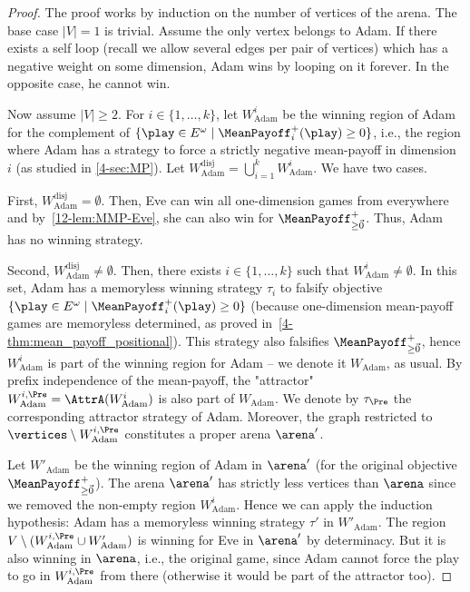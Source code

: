 \begin{proof}
The proof works by induction on the number of vertices of the arena. The base case $\vert V\vert = 1$ is trivial. Assume the only vertex belongs to Adam. If there exists a self loop (recall we allow several edges per pair of vertices) which has a negative weight on some dimension, Adam wins by looping on it forever. In the opposite case, he cannot win.

Now assume $\vert V\vert \geq 2$. For $i \in \{1,\ldots,k\}$, let $W^i_{\text{Adam}}$ be the winning region of Adam for the complement of $\{\play \in E^\omega \mid \MeanPayoff^{+}_{i}(\play) \geq 0\}$, i.e., the region where Adam has a strategy to force a strictly negative mean-payoff in dimension $i$ (as studied in \cref{4-sec:MP}). Let $W^{\text{disj}}_{\text{Adam}} = \bigcup_{i = 1}^{k} W^i_{\text{Adam}}$. We have two cases.

First, $W^{\text{disj}}_{\text{Adam}} = \emptyset$. Then, Eve can win all one-dimension games from everywhere and by~\cref{12-lem:MMP-Eve}, she can also win for $\MeanPayoff^{+}_{\geq \vec{0}}$. Thus, Adam has no winning strategy.

Second, $W^{\text{disj}}_{\text{Adam}} \neq \emptyset$. Then, there exists $i \in \{1,\ldots,k\}$ such that $W^i_{\text{Adam}} \neq \emptyset$. In this set, Adam has a memoryless winning strategy $\tau_i$ to falsify objective $\{\play \in E^\omega \mid \MeanPayoff^{+}_{i}(\play) \geq 0\}$ (because one-dimension mean-payoff games are memoryless determined, as proved in~\cref{4-thm:mean_payoff_positional}). This strategy also falsifies $\MeanPayoff^{+}_{\geq \vec{0}}$, hence $W^i_{\text{Adam}}$ is part of the winning region for Adam -- we denote it $W_{\text{Adam}}$, as usual.
By prefix independence of the mean-payoff, the "attractor" $W^{i, \Pre}_{\text{Adam}}= \AttrA(W^i_{\text{Adam}})$ is also part of $W_{\text{Adam}}$. We denote by $\tau_\Pre$ the corresponding attractor strategy of Adam. Moreover, the graph restricted to $\vertices \setminus W^{i, \Pre}_{\text{Adam}}$ constitutes a proper arena $\arena'$.

Let $W'_{\text{Adam}}$ be the winning region of Adam in $\arena'$ (for the original objective $\MeanPayoff^{+}_{\geq \vec{0}}$). The arena $\arena'$ has strictly less vertices than $\arena$ since we removed the non-empty region $W^i_{\text{Adam}}$. Hence we can apply the induction hypothesis: Adam has a memoryless winning strategy $\tau'$ in $W'_{\text{Adam}}$. The region $V \setminus (W^{i, \Pre}_{\text{Adam}} \cup W'_{\text{Adam}})$ is winning for Eve in $\arena'$ by determinacy. But it is also winning in $\arena$, i.e., the original game, since Adam cannot force the play to go in $W^{i, \Pre}_{\text{Adam}}$ from there (otherwise it would be part of the attractor too).


\end{proof}
